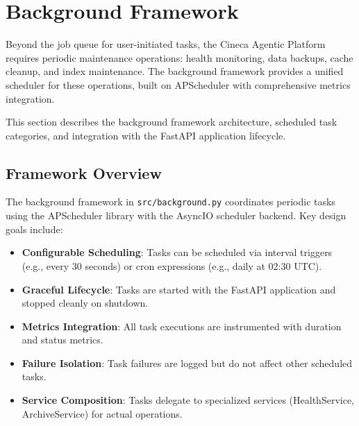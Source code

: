 
\section{Background Framework}
\label{sec:background-framework}

Beyond the job queue for user-initiated tasks, the Cineca Agentic Platform requires periodic maintenance operations: health monitoring, data backups, cache cleanup, and index maintenance. The background framework provides a unified scheduler for these operations, built on APScheduler with comprehensive metrics integration.

This section describes the background framework architecture, scheduled task categories, and integration with the FastAPI application lifecycle.

\subsection{Framework Overview}

The background framework in \texttt{src/background.py} coordinates periodic tasks using the APScheduler library with the AsyncIO scheduler backend. Key design goals include:

\begin{itemize}
    \item \textbf{Configurable Scheduling}: Tasks can be scheduled via interval triggers (e.g., every 30 seconds) or cron expressions (e.g., daily at 02:30 UTC).
    
    \item \textbf{Graceful Lifecycle}: Tasks are started with the FastAPI application and stopped cleanly on shutdown.
    
    \item \textbf{Metrics Integration}: All task executions are instrumented with duration and status metrics.
    
    \item \textbf{Failure Isolation}: Task failures are logged but do not affect other scheduled tasks.
    
    \item \textbf{Service Composition}: Tasks delegate to specialized services (HealthService, ArchiveService) for actual operations.
\end{itemize}


